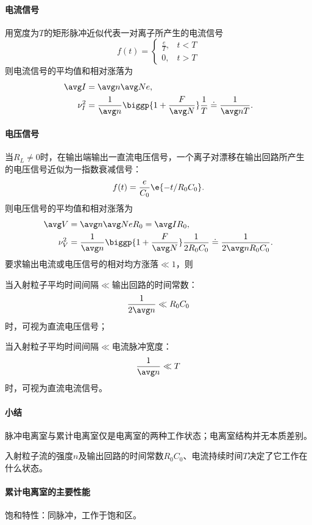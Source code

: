 \paragraph{电流信号}用宽度为$T$的矩形脉冲近似代表一对离子所产生的电流信号
\[
	f(t)=\begin{cases}
		\frac eT,&t<T\\
		0,&t>T
	\end{cases}
\]
则电流信号的平均值和相对涨落为
\begin{align}
	\avg I&=\avg n\avg Ne,\\
	\nu_I^2&=\frac1{\avg n}\biggp{1+\frac F{\avg N}}\frac1T\doteq\frac1{\avg nT}.
\end{align}
\paragraph{电压信号}
当$R_L\neq 0$时，在输出端输出一直流电压信号，一个离子对漂移在输出回路所产生的电压信号近似为一指数衰减信号：
\[
	f(t)=\frac e{C_0}\e{-t/R_0C_0}.
\]
则电压信号的平均值和相对涨落为
\begin{align}
	\avg V&=\avg n\avg NeR_0=\avg IR_0,\\
	\nu_V^2&=\frac1{\avg n}\biggp{1+\frac F{\avg N}}\frac1{2R_0C_0}\doteq\frac1{2\avg nR_0C_0}.
\end{align}
要求输出电流或电压信号的相对均方涨落$\ll 1$，则
\begin{compactenum}
	\item 
	当入射粒子平均时间间隔$\ll$输出回路的时间常数：
	\[
		\frac1{2\avg n}\ll R_0C_0
	\]
	时，可视为直流电压信号；
	\item 
	当入射粒子平均时间间隔$\ll$电流脉冲宽度：
	\[
		\frac1{\avg n}\ll T
	\]
	时，可视为直流电流信号。
\end{compactenum}
\paragraph{小结}
\begin{compactenum}
	\item 脉冲电离室与累计电离室仅是电离室的两种工作状态；电离室结构并无本质差别。
	\item 入射粒子流的强度$n$及输出回路的时间常数$R_0C_0$、电流持续时间$T$决定了它工作在什么状态。
\end{compactenum}
\paragraph{累计电离室的主要性能}
饱和特性：同脉冲，工作于饱和区。

